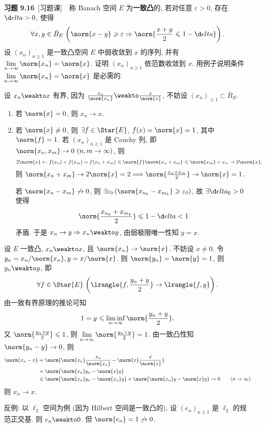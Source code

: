 	\textbf{习题 9.16}\ [习题课]\ \ 称 Banach 空间 $ E $ 为\textbf{一致凸}的, 若对任意 $ \varepsilon>0 $, 存在 $ \d elta>0 $, 使得
	\[
		\forall x, y\in\bar{B}_{E}\,\left(\norm{x-y}\geqslant\varepsilon\Rightarrow \norm{\frac{x+y}{2}\leqslant 1-\d elta}\right).
	\]
	设 $ (x_{n})_{n\geqslant1} $ 是一致凸空间 $ E $ 中弱收敛到 $ x $ 的序列, 并有 $ \lim\limits_{n\to\infty}\norm{x_{n}}=\norm{x} $. 证明 $ (x_{n})_{n\geqslant1} $ 依范数收敛到 $ x $. 用例子说明条件 $ \lim\limits_{n\to\infty}\norm{x_{n}}=\norm{x} $ 是必需的.
	\begin{answer}
		设 $ x_{n}\weakto x $ 有界, 因为 $ \frac{x_{n}}{\norm{x_{n}}}\weakto\frac{x}{\norm{x}} $, 不妨设 $ (x_{n})_{\geqslant1}\subset\bar{B}_{E} $.
		\begin{enumerate}
			\item 若 $ \norm{x}=0 $, 则 $ x_{n}\to x $.
			\item 若 $ \norm{x}\ne 0 $, 则 $ \exists f\in\Star{E} $, $ f(x)=\norm{x}=1 $, 其中 $ \norm{f}=1 $. 若 $ (x_{n})_{n\geqslant1} $ 是 Cauchy 列, 即 $ \norm{x_{n}, x_{m}}\to 0\ (n, m\to\infty) $, 则
			\[
				2\norm{x}\leftarrow f(x_{n})+f(x_{m})=f(x_{n}+x_{m})\leqslant\norm{f}\norm{x_{n}+x_{m}}\leqslant\norm{x_{m}}+x_{n}\to 2\norm{x},
			\]
			则 $ \norm{x_{n}+x_{m}}\to 2\norm{x}=2\Longrightarrow \norm{\frac{x_{n}+x_{m}}{2}}\to \norm{x}=1 $.

			若 $ \norm{x_{n}-x_{m}}\not\to 0 $, 则 $ \exists\varepsilon_{0}\,(\norm{x_{n_{k}}-x_{m_{k}}}\geqslant\varepsilon_{0}) $, 故 $ \exists \d elta_{0}>0 $ 使得
			\[
				\norm{\frac{x_{n_{k}}+x_{m_{k}}}{2}}\leqslant1-\d elta<1
			\]
			矛盾. 于是 $ x_{n}\to y\Rightarrow x_{n}\weakto y $, 由弱极限唯一性知 $ y=x $.\qedhere
		\end{enumerate}
	\end{answer}
	\begin{answer}[另证]
		设 $ E $ 一致凸, $ x_{n}\weakto x $, 且 $ \norm{x_{n}}\to\norm{x} $. 不妨设 $ x\ne 0 $. 令 $ y_{n}=x_{n}/\norm{x_{n}}, y=x/\norm{x} $. 则 $ \norm{y_{n}}=\norm{y}=1 $, 则 $ y_{n}\weakto y $, 即
		\[
			\forall f\in\Star{E}\,\left( \lrangle{f, \frac{y_{n}+y}{2}}\to \lrangle{f, y} \right).
		\]
		由一致有界原理的推论可知
		\[
			1=y\leqslant\liminf_{n\to\infty}\norm{\frac{y_{n}+y}{2}}.
		\]
		又 $ \norm{\frac{y_{n}+y}{2}}\leqslant1 $, 则 $ \lim\limits_{n\to\infty}\norm{\frac{y_{n}+y}{2}}=1 $. 由一致凸性知 $ \norm{y_{n}-y}\to 0 $, 则
		\[
			\begin{aligned}
				\norm{x_{n}-x} & = \norm{\norm{x_{n}}\frac{x_{n}}{\norm{x_{n}}}-\norm{x}\frac{x}{\norm{x}}}\\
				& = \norm{\norm{x_{n}}y_{n}-\norm{x}y}\\
				& \leqslant\norm{\norm{x_{n}}y_{n}-\norm{x_{n}}y}+\norm{\norm{x_{n}}y-\norm{x}y}\to 0\qquad (n\to\infty)
			\end{aligned}
		\]
		则 $ x_{n}\to x $.

		反例: 以 $ \ell_{2} $ 空间为例 (因为 Hilbert 空间是一致凸的), 设 $ (e_{n})_{n\geqslant1} $ 是 $ \ell_{2} $ 的规范正交基. 则 $ e_{n}\weakto 0 $. 但 $ \norm{e_{n}}=1\not\to 0 $.\qedhere
	\end{answer}

